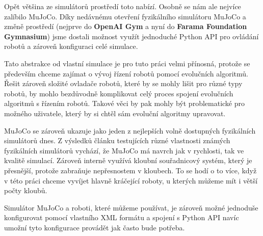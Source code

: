 Opět většina ze simulátorů prostředí toto nabízí. Osobně se nám ale nejvíce
zalíbilo MuJoCo. Díky nedávnému otevření fyzikálního simulátoru MuJoCo a změně
prostředí (nejprve do \textbf{OpenAI Gym} a nyní do \textbf{Farama Foundation
Gymnasium}) jsme dostali možnost využít jednoduché Python API pro ovládání
robotů a zároveň konfiguraci celé simulace. 

Tato abstrakce od vlastní simulace je pro tuto práci velmi přínosná, protože se
především chceme zajímat o vývoj řízení robotů pomocí evolučních algoritmů.
Řešit zároveň složité ovladače robotů, které by se mohly lišit pro různé typy
robotů, by mohlo bezdůvodně komplikovat celý proces spojení evolučních
algoritmů s řízením robotů. Takové věci by pak mohly být problematické pro
možného uživatele, který by si chtěl sám evoluční algoritmy upravovat.

MuJoCo se zároveň ukazuje jako jeden z nejlepších volně dostupných fyzikálních
simulátorů dnes. Z výsledků článku testujících různé vlastnosti známých fyzikálních
simulátorů \citet{erez2015simulation} vychází, že MuJoCo má navrch jak v
rychlosti, tak ve kvalitě simulací. Zároveň interně využívá kloubní
souřadnicový systém, který je přesnější, protože zabraňuje nepřesnostem v
kloubech. To se hodí o to více, když v této práci chceme vyvíjet hlavně
kráčející roboty, u kterých můžeme mít i větší počty kloubů. 

Simulátor MuJoCo a roboti, které můžeme používat, je zároveň možné
jednoduše konfigurovat pomocí vlastního XML formátu a spojení s Python API
navíc umožní tyto konfigurace provádět jak často bude potřeba.
